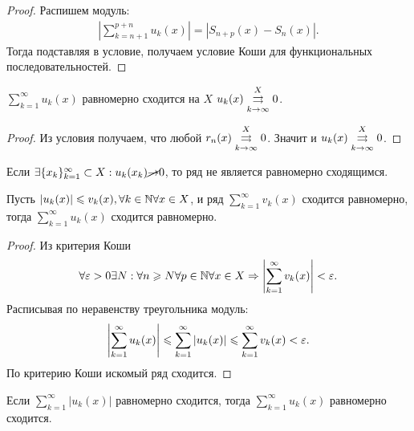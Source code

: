 \documentclass[../main.tex]{subfiles}
\begin{document}
\begin{proof}
  Распишем модуль: 
  \begin{gather} 
    \left| \sum_{k=n+1}^{p+n} u_k(x)   \right| = \left| S_{n+p} (x) - S_{n} (x) \right|.
  \end{gather}
  Тогда подставляя в условие, получаем условие Коши для функциональных последовательностей.
\end{proof}


\begin{proposition}
  $ \sum_{k=1}^{\infty} u_k(x)  $  равномерно сходится на $ X$ \hence $ u_k(x) \convergesuniformly{k \to \infty}{X} 0 $.
\end{proposition}


\begin{proof}
  Из условия получаем, что любой $ r_{n}(x) \convergesuniformly{k \to \infty}{X} 0$. Значит и $ u_k(x)  \convergesuniformly{k \to \infty}{X} 0$.
\end{proof}


\begin{corollary}
  Если $ \exists \{ x_{k} \}_{k = 1}^{\infty} \subset X: u_k(x_k ) \cancel{\to} 0$, то ряд не является равномерно сходящимся. 
\end{corollary}


\begin{proposition}
  Пусть $ \left| u_k(x)  \right| \leq v_k(x), \forall k \in \N \forall x \in X$, и ряд $ \sum_{k=1}^{\infty} v_k(x)  $ сходится равномерно, тогда $ \sum_{k=1}^{\infty} u_k(x)  $  сходится равномерно.
\end{proposition}


\begin{proof}
  Из критерия Коши 
  \begin{gather} 
    \forall \eps > 0 \exists N: \forall n \geq N \forall p \in \N \forall x \in X \hence \left| \sum_{k=1}^{\infty} v_k(x)   \right| < \eps .
  \end{gather}
  Расписывая по неравенству треугольника модуль: 
  \begin{gather} 
    \left| \sum_{k=1}^{\infty} u_k(x)  \right| \leq \sum_{k=1}^{\infty} \left| u_k(x)  \right| \leq \sum_{k=1}^{\infty} v_k(x) <\eps   .
  \end{gather}
  По критерию Коши искомый ряд сходится.
\end{proof}


\begin{corollary}
  Если $ \sum_{k=1}^{\infty} \left| u_k(x)  \right|  $ равномерно сходится, тогда $ \sum_{k=1}^{\infty} u_k(x)  $ равномерно сходится.
\end{corollary}
\end{document}

